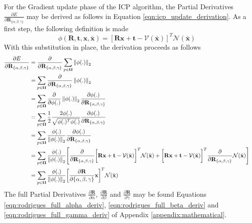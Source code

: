 For the Gradient update phase of the ICP algorithm, the Partial Derivatives
$\frac{\partial E}{\partial \mathbf{R}_{\{\alpha, \beta, \gamma\}}}$ may be
derived as follows in Equation \ref{eqn:icp_update_derivation}.
As a first step, the following definition is made
\begin{equation}
  \label{eqn:icp_deriv_sub}
  \phi(\mathbf{R}, \mathbf{t}, \mathbf{x}, \bar{\mathbf{x}}) =
  \left[
    \mathbf{Rx} + \mathbf{t} - \mathcal{V}(\bar{\mathbf{x}})
  \right]^{T}
  \mathcal{N}(\bar{\mathbf{x}})
\end{equation}
With this substitution in place, the derivation proceeds as follows
\begin{equation}
  \label{eqn:icp_update_derivation_rot}
  \begin{split}
    \frac{\partial E}{\partial \mathbf{R}_{\{\alpha, \beta, \gamma\}}} & =
    \frac{\partial}{\partial \mathbf{R}_{\{\alpha, \beta, \gamma\}}}
    \sum_{p \in \mathbf{\Omega}}
    \left\lVert\phi(.)\right\rVert_{2}\\
    & = \sum_{p \in \mathbf{\Omega}}
    \frac{\partial}{\partial \mathbf{R}_{\{\alpha, \beta, \gamma\}}}
    \left\lVert\phi(.)\right\rVert_{2}\\
    & = \sum_{p \in \mathbf{\Omega}}
    \frac{\partial}{\partial \phi(.)} \left\lVert\phi(.)\right\rVert_{2}
    \frac{\partial \phi(.)}{\partial \mathbf{R}_{\{\alpha, \beta, \gamma\}}}\\
    & = \sum_{p \in \mathbf{\Omega}}
    \frac{1}{2}\frac{2 \phi(.)}{\sqrt{\phi(.)^{T}\phi(.)}}
    \frac{\partial \phi(.)}{\partial \mathbf{R}_{\{\alpha, \beta, \gamma\}}}\\
    & = \sum_{p \in \mathbf{\Omega}}
    \frac{\phi(.)}{\left\lVert\phi(.)\right\rVert_{2}}
    \frac{\partial \phi(.)}{\partial \mathbf{R}_{\{\alpha, \beta, \gamma\}}}\\
    & = \sum_{p \in \mathbf{\Omega}}
    \frac{\phi(.)}{\left\lVert\phi(.)\right\rVert_{2}}
    \Bigg[ \frac{\partial}{\partial \mathbf{R_{\{\alpha, \beta, \gamma\}}}}
    \bigg[ \mathbf{Rx} + \mathbf{t} - \mathcal{V}(\bar{\mathbf{x}}) \bigg]^{T}
    \mathcal{N}(\bar{\mathbf{x}}) + 
    \bigg[ \mathbf{Rx} + \mathbf{t} - \mathcal{V}(\bar{\mathbf{x}}) \bigg]^{T}
    \frac{\partial}{\partial \mathbf{R}_{\{\alpha, \beta, \gamma\}}}
    \mathcal{N}(\bar{\mathbf{x}})\Bigg]\\
    & = \sum_{p \in \mathbf{\Omega}}
    \frac{\phi(.)}{\left\lVert\phi(.)\right\rVert_{2}}
    \bigg[ \frac{\partial \mathbf{R}}{\partial \{\alpha, \beta, \gamma\}}
    \mathbf{x}\bigg]^{T}
    \mathcal{N}(\bar{\mathbf{x}})
  \end{split}
\end{equation}
The full Partial Derivatives $\frac{\partial \mathbf{R}}{\partial \alpha}$,
$\frac{\partial \mathbf{R}}{\partial \beta}$ and
$\frac{\partial \mathbf{R}}{\partial \gamma}$ may be found Equations
\ref{eqn:rodrigues_full_alpha_deriv}, \ref{eqn:rodrigues_full_beta_deriv}
and \ref{eqn:rodrigues_full_gamma_deriv} of Appendix 
\ref{appendix:mathematical}.

